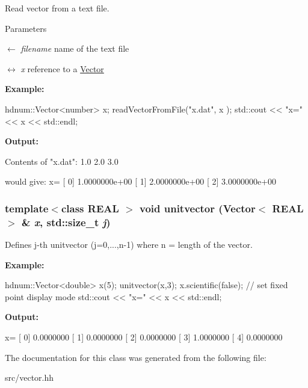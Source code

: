 Read vector from a text file. 


\begin{DoxyParams}{Parameters}
\item[\mbox{$\leftarrow$} {\em filename}]name of the text file \item[\mbox{$\leftrightarrow$} {\em x}]reference to a \hyperlink{classhdnum_1_1Vector}{Vector}\end{DoxyParams}
{\bfseries Example:} 
\begin{DoxyCode}
  hdnum::Vector<number> x;
  readVectorFromFile("x.dat", x );
  std::cout << "x=" << x << std::endl;
\end{DoxyCode}


{\bfseries Output:} \begin{DoxyVerb}
Contents of "x.dat":
1.0
2.0
3.0

would give:
x=
[ 0]  1.0000000e+00
[ 1]  2.0000000e+00
[ 2]  3.0000000e+00
	\end{DoxyVerb}
 \hypertarget{classhdnum_1_1Vector_a99ec4439cc5942afee540708022372e7}{
\subsubsection[{unitvector}]{\setlength{\rightskip}{0pt plus 5cm}template$<$class REAL $>$ void unitvector ({\bf Vector}$<$ REAL $>$ \& {\em x}, \/  std::size\_\-t {\em j})}}
\label{classhdnum_1_1Vector_a99ec4439cc5942afee540708022372e7}


Defines j-\/th unitvector (j=0,...,n-\/1) where n = length of the vector. 

{\bfseries Example:} 
\begin{DoxyCode}
  hdnum::Vector<double> x(5);
  unitvector(x,3);
  x.scientific(false); // set fixed point display mode
  std::cout << "x=" << x << std::endl;
\end{DoxyCode}


{\bfseries Output:} \begin{DoxyVerb}
x=
[ 0]      0.0000000
[ 1]      0.0000000
[ 2]      0.0000000
[ 3]      1.0000000
[ 4]      0.0000000
	  \end{DoxyVerb}
 

The documentation for this class was generated from the following file:\begin{DoxyCompactItemize}
\item 
src/vector.hh\end{DoxyCompactItemize}
